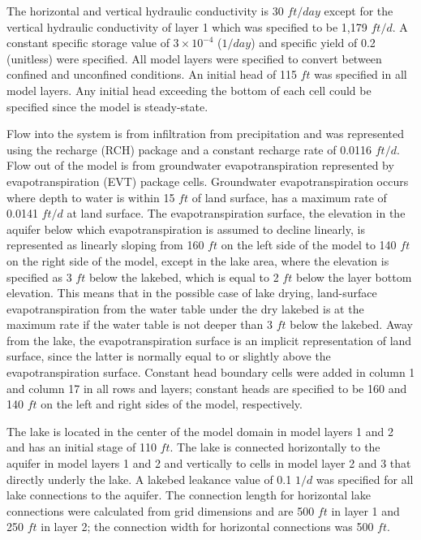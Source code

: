 

The horizontal and vertical hydraulic conductivity is 30 $ft/day$ except for the vertical hydraulic conductivity of layer 1 which was specified to be 1,179 $ft/d$. A constant specific storage value of $3 \times 10^{-4}$ ($1/day$) and specific yield of 0.2 (unitless) were specified. All model layers were specified to convert between confined and unconfined conditions. An initial head of 115 $ft$ was specified in all model layers. Any initial head exceeding the bottom of each cell could be specified since the model is steady-state.

Flow into the system is from infiltration from precipitation and was represented using the recharge (RCH) package and a constant recharge rate of 0.0116 $ft/d$. Flow out of the model is from groundwater evapotranspiration represented by evapotranspiration (EVT) package cells. Groundwater evapotranspiration occurs where depth to water is within 15 $ft$ of land surface, has a maximum rate of 0.0141 $ft/d$ at land surface. The evapotranspiration surface, the elevation in the aquifer below which evapotranspiration is assumed to decline linearly, is represented as linearly sloping from 160 $ft$ on the left side of the model to 140 $ft$ on the right side of the model, except in the lake area, where the elevation is specified as 3 $ft$ below the lakebed, which is equal to 2 $ft$ below the layer bottom elevation. This means that in the possible case of lake drying, land-surface evapotranspiration from the water table under the dry lakebed is at the maximum rate if the water table is not deeper than 3 $ft$ below the lakebed. Away from the lake, the evapotranspiration surface is an implicit representation of land surface, since the latter is normally equal to or slightly above the evapotranspiration surface. Constant head boundary cells were added in column 1 and column 17 in all rows and layers; constant heads are specified to be 160 and 140 $ft$ on the left and right sides of the model, respectively.

The lake is located in the center of the model domain in model layers 1 and 2 and has an initial stage of 110 $ft$. The lake is connected horizontally to the aquifer in model layers 1 and 2 and vertically to cells in model layer 2 and 3 that directly underly the lake. A lakebed leakance value of 0.1 $1/d$ was specified for all lake connections to the aquifer. The connection length for horizontal lake connections were calculated from grid dimensions and are 500 $ft$ in layer 1 and 250 $ft$ in layer 2; the connection width for horizontal connections was 500 $ft$.

